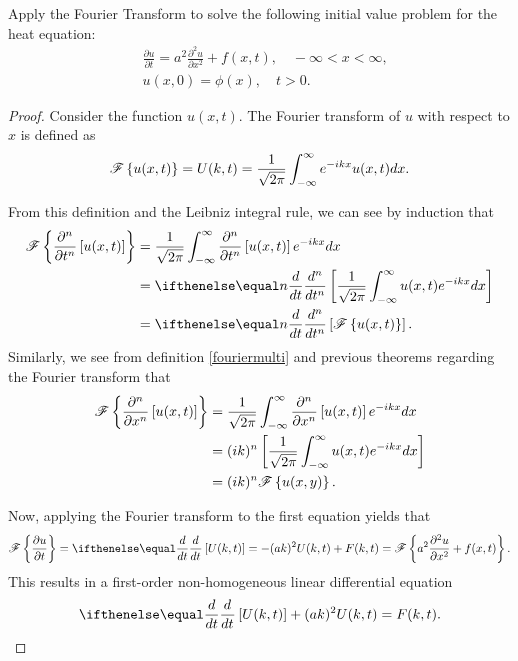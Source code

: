 \begin{problem}{5}
  Apply the Fourier Transform to solve the following initial value problem for the heat equation:
  \begin{align*}
    &\frac{\partial u}{\partial t} = a^2 \frac{\partial^2 u}{\partial x^2} + f(x, t), \quad -\infty < x < \infty,\\
    &u(x, 0) = \phi(x), \quad t >0.
  \end{align*}
\end{problem}

\begin{proof}
  Consider the function $u(x, t)$. The Fourier transform
  of $u$ with respect to $x$ is defined as
  \begin{align}\label{fouriermulti}
    \mathscr{F}\left\{ {u(x, t)} \right\} = U(k, t) = \frac{1}{\sqrt{2\pi}}\int_{-\infty}^{\infty} e^{-ikx} u(x, t) dx.
  \end{align}

  From this definition and the Leibniz integral rule, we can see by induction that
  \begin{align}\label{partialy}
    \fourier{\frac{\partial^n }{\partial t^n }\left[u(x,t)\right]}
    &= \frac{1}{\sqrt{2\pi}}\int_{-\infty}^\infty \frac{\partial^n}{ \partial t^n}\left[ u(x, t)\right] e^{-ikx} dx \notag \\
    &= \der{t}{n}\left[\frac{1}{\sqrt{2\pi}} \int_{-\infty}^\infty u(x, t) e^{-ikx} dx \right] \notag \\
    &= \der{t}{n}\left[\fourier{u(x,t)}\right].
  \end{align}
  Similarly, we see from definition \eqref{fouriermulti} and previous
  theorems regarding the Fourier transform that
  \begin{align}\label{partialx}
    \mathscr{F}\left\{ {\frac{\partial^n}{\partial x^n}\left[u(x, t)\right]} \right\}
    &= \frac{1}{\sqrt{2\pi}}\int_{-\infty}^\infty \frac{\partial^n}{\partial x^n}\left[u(x, t)\right] e^{-ikx} dx \notag \\
    &= (ik)^n \left[\frac{1}{\sqrt{2\pi}} \int_{-\infty}^\infty u(x,t)e^{-ikx} dx \right] \notag \\
    &= (ik)^n \mathscr{F}\left\{ {u(x,y)} \right\}.
  \end{align}

  Now, applying the Fourier transform to the first equation yields that
  \begin{align*}
    \fourier{\frac{\partial u}{\partial t}} = \der{t}{}\left[U(k, t)\right] = -(ak)^2 U(k,t) + F(k, t) =  \fourier{a^2 \frac{\partial^2 u}{\partial x^2} + f(x, t)}.
  \end{align*}
  This results in a first-order non-homogeneous linear differential equation
  \begin{align*}
    \der{t}{}\left[U(k, t)\right] + (ak)^2 U(k,t) = F(k, t).
  \end{align*}
\end{proof}
\newpage
